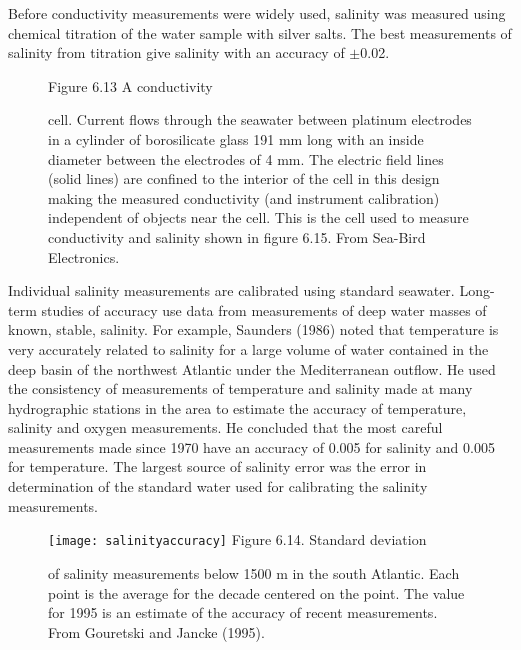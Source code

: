 Before conductivity measurements were widely used, salinity
was measured using chemical titration
of the water sample with silver salts. The best measurements of
salinity from titration give salinity with an
accuracy of $\pm$0.02.

\begin{figure}[t!]
\footnotesize
Figure 6.13 A conductivity \rule{0pt}{4ex}cell. Current flows through
the seawater between platinum electrodes in a cylinder of borosilicate
glass 191 mm long with an inside diameter between the electrodes of 4
mm. The electric field lines (solid lines) are confined to the
interior of the cell in this design making the measured conductivity
(and instrument calibration) independent of objects near the
cell. This is the cell used to measure conductivity and salinity shown
in figure 6.15. From Sea-Bird Electronics.
\label{fig:conductivity}
\vspace{-3ex}
\end{figure}

Individual salinity measurements are
calibrated using standard seawater. Long-term studies of
accuracy use data from measurements of deep
water masses of known, stable, salinity. For example, Saunders (1986)
noted that temperature is very accurately related to salinity for a
large volume of water contained in the deep basin of the northwest
Atlantic under the Mediterranean outflow. He used the consistency of
measurements of temperature and salinity made at many hydrographic
stations in the area to
estimate the accuracy of temperature,
salinity and oxygen measurements. He concluded that the most careful
measurements made since 1970 have an accuracy of 0.005 for salinity
and 0.005 for temperature. The largest source of salinity
error was the error in determination of the standard water used for
calibrating the salinity measurements.

\begin{figure}[t!]
\texttt{[image: salinityaccuracy]}
\footnotesize
Figure 6.14. Standard deviation \rule{0mm}{3ex}of salinity
measurements below 1500 m in the south Atlantic. Each point is the
average for the decade centered on the point. The value for 1995 is an
estimate of the accuracy of recent
measurements. From Gouretski and Jancke (1995).
\label{fig:salinityaccuracy}
\vspace{-4ex}
\end{figure}

